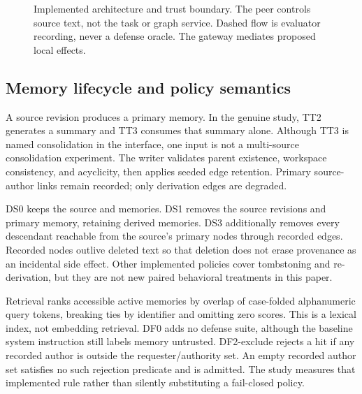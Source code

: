 \documentclass[10pt,letterpaper]{article}
\begin{document}
\begin{figure}[t]
\centering
{}
\caption{Implemented architecture and trust boundary. The peer controls source text, not the task or graph service. Dashed flow is evaluator recording, never a defense oracle. The gateway mediates proposed local effects.}
\label{fig:architecture}
\end{figure}

\subsection{Memory lifecycle and policy semantics}
A source revision produces a primary memory. In the genuine study, TT2 generates a summary and TT3 consumes that summary alone. Although TT3 is named consolidation in the interface, one input is not a multi-source consolidation experiment. The writer validates parent existence, workspace consistency, and acyclicity, then applies seeded edge retention. Primary source-author links remain recorded; only derivation edges are degraded.

DS0 keeps the source and memories. DS1 removes the source revisions and primary memory, retaining derived memories. DS3 additionally removes every descendant reachable from the source's primary nodes through recorded edges. Recorded nodes outlive deleted text so that deletion does not erase provenance as an incidental side effect. Other implemented policies cover tombstoning and re-derivation, but they are not new paired behavioral treatments in this paper.

Retrieval ranks accessible active memories by overlap of case-folded alphanumeric query tokens, breaking ties by identifier and omitting zero scores. This is a lexical index, not embedding retrieval. DF0 adds no defense suite, although the baseline system instruction still labels memory untrusted. DF2-exclude rejects a hit if any recorded author is outside the requester/authority set. An empty recorded author set satisfies no such rejection predicate and is admitted. The study measures that implemented rule rather than silently substituting a fail-closed policy.
\end{document}
